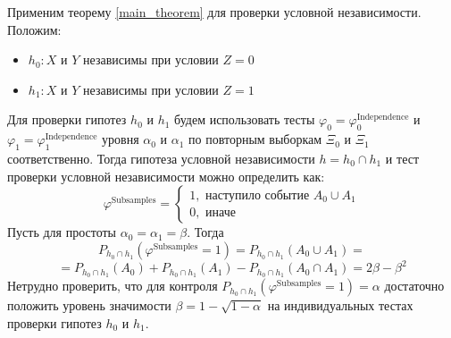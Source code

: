 Применим теорему \ref{main_theorem} для проверки условной независимости.
Положим:
\begin{itemize}
    \item $h_0 : X$ и $Y$ независимы при условии $Z=0$
    \item $h_1 : X$ и $Y$ независимы при условии $Z=1$
\end{itemize}
Для проверки гипотез $h_0$ и $h_1$ будем использовать тесты
$\varphi_0 = \varphi^{\text{Independence}}_0$ и 
$\varphi_1 = \varphi^{\text{Independence}}_1$ уровня $\alpha_0$ и $\alpha_1$ 
по повторным выборкам
$\Xi_0$ и $\Xi_1$ соответственно.
Тогда гипотеза
условной независимости $h = h_0 \cap h_1$ и тест проверки условной независимости можно определить как:
$$
\varphi^{\text{Subsamples}}=\begin{cases}
    1, \text{ наступило событие $A_0 \cup A_1$}\\
    0, \text{ иначе}
\end{cases}
$$
Пусть для простоты $\alpha_0 = \alpha_1 = \beta$.
Тогда $$P_{h_0 \cap h_1}(\varphi^{\text{Subsamples}}=1)=P_{h_0 \cap h_1}(A_0 \cup A_1)=$$ 
$$ = P_{h_0 \cap h_1}(A_0) + P_{h_0 \cap h_1}(A_1) - 
P_{h_0 \cap h_1}(A_0 \cap A_1) = 2\beta - \beta^2$$
Нетрудно проверить, что для контроля $P_{h_0 \cap h_1}(\varphi^{\text{Subsamples}}=1)=\alpha$ достаточно положить
уровень значимости $\beta = 1 - \sqrt{1-\alpha}$ на индивидуальных
тестах проверки гипотез $h_0$ и $h_1$.
